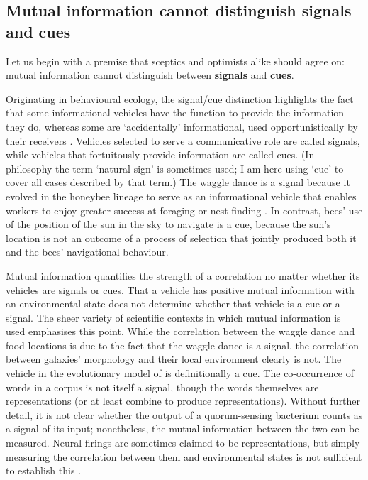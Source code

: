 \subsection{Mutual information cannot distinguish signals and cues}

Let us begin with a premise that sceptics and optimists alike should agree on: mutual information cannot distinguish between \textbf{signals} and \textbf{cues}.

Originating in behavioural ecology, the signal/cue distinction highlights the fact that some informational vehicles have the function to provide the information they do, whereas some are `accidentally' informational, used opportunistically by their receivers \citep[$\S$1.2]{maynardsmith2003animal}.
Vehicles selected to serve a communicative role are called signals, while vehicles that fortuitously provide information are called cues.
(In philosophy the term `natural sign' is sometimes used; I am here using `cue' to cover all cases described by that term.)
The waggle dance is a signal because it evolved in the honeybee lineage to serve as an informational vehicle that enables workers to enjoy greater success at foraging or nest-finding \citep{gould1975honey,riley2005flight}.
In contrast, bees' use of the position of the sun in the sky to navigate is a cue, because the sun's location is not an outcome of a process of selection that jointly produced both it and the bees' navigational behaviour.

Mutual information quantifies the strength of a correlation no matter whether its vehicles are signals or cues.
That a vehicle has positive mutual information with an environmental state does not determine whether that vehicle is a cue or a signal.
The sheer variety of scientific contexts in which mutual information is used emphasises this point.
While the correlation between the waggle dance and food locations is due to the fact that the waggle dance is a signal, the correlation between galaxies' morphology and their local environment clearly is not.
The vehicle in the evolutionary model of \citet{donaldson-matasci2010fitness} is definitionally a cue.
The co-occurrence of words in a corpus is not itself a signal, though the words themselves are representations (or at least combine to produce representations).
Without further detail, it is not clear whether the output of a quorum-sensing bacterium counts as a signal of its input; nonetheless, the mutual information between the two can be measured.
Neural firings are sometimes claimed to be representations, but simply measuring the correlation between them and environmental states is not sufficient to establish this \citep{rathkopf2017neural}.

